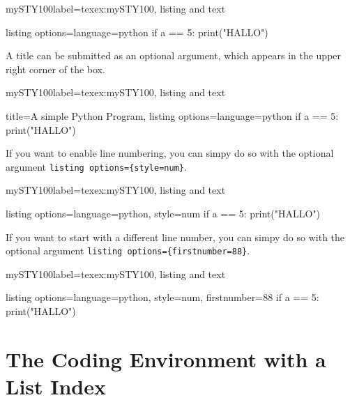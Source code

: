 \documentclass[]{myHOWTO-V001}
\begin{document}
\begin{myTEXEXdoclst}{mySTY100}{label={texex:mySTY100}, listing and text}
\begin{myCODEEX}{listing options={language=python}}
if a == 5:
	print("HALLO")
\end{myCODEEX}
\end{myTEXEXdoclst}

A title can be submitted as an optional argument, which appears in the upper right corner of the box.

\begin{myTEXEXdoclst}{mySTY100}{label={texex:mySTY100}, listing and text}
\begin{myCODEEX}{title={A simple Python Program}, listing options={language=python}}
if a == 5:
	print("HALLO")
\end{myCODEEX}
\end{myTEXEXdoclst}

If you want to enable line numbering, you can simpy do so with the optional argument \verb|listing options={style=num}|.

\begin{myTEXEXdoclst}{mySTY100}{label={texex:mySTY100}, listing and text}
\begin{myCODEEX}{listing options={language=python, style=num}}
if a == 5:
	print("HALLO")
\end{myCODEEX}
\end{myTEXEXdoclst}

If you want to start with a different line number, you can simpy do so with the optional argument \verb|listing options={firstnumber=88}|.

\begin{myTEXEXdoclst}{mySTY100}{label={texex:mySTY100}, listing and text}
\begin{myCODEEX}{listing options={language=python, style=num, firstnumber=88}}
if a == 5:
	print("HALLO")
\end{myCODEEX}
\end{myTEXEXdoclst}

%
%

\section{The Coding Environment with a List Index}
\end{document}
